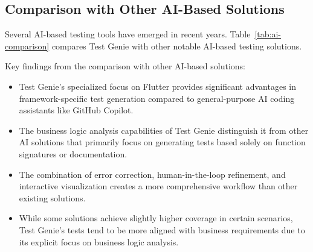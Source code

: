 \subsection{Comparison with Other AI-Based Solutions}

Several AI-based testing tools have emerged in recent years. Table~\ref{tab:ai-comparison} compares Test Genie with other notable AI-based testing solutions.

\begin{table}[ht]
    \centering
    \caption{Comparison with Other AI-Based Testing Solutions}
    \label{tab:ai-comparison}
\end{table}

Key findings from the comparison with other AI-based solutions:

\begin{itemize}
    \item Test Genie's specialized focus on Flutter provides significant advantages in framework-specific test generation compared to general-purpose AI coding assistants like GitHub Copilot.
    
    \item The business logic analysis capabilities of Test Genie distinguish it from other AI solutions that primarily focus on generating tests based solely on function signatures or documentation.
    
    \item The combination of error correction, human-in-the-loop refinement, and interactive visualization creates a more comprehensive workflow than other existing solutions.
    
    \item While some solutions achieve slightly higher coverage in certain scenarios, Test Genie's tests tend to be more aligned with business requirements due to its explicit focus on business logic analysis.
\end{itemize}

